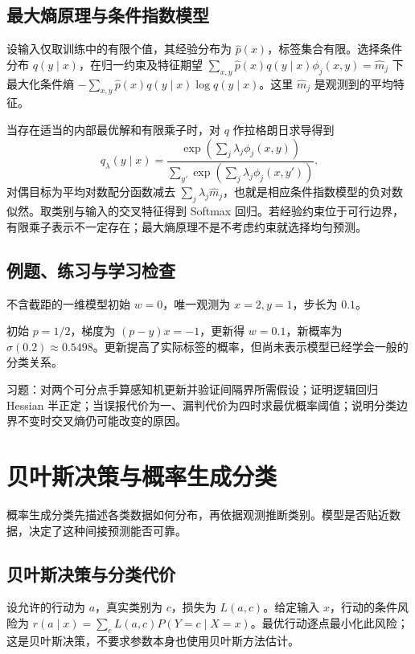 \documentclass[UTF8,12pt,a4paper,fontset=fandol]{ctexbook}
\begin{document}
\section{最大熵原理与条件指数模型}

设输入仅取训练中的有限个值，其经验分布为 $\widehat p(x)$，标签集合有限。选择条件分布 $q(y\mid x)$，在归一约束及特征期望
$\sum_{x,y}\widehat p(x)q(y\mid x)\phi_j(x,y)=\widehat m_j$
下最大化条件熵 $-\sum_{x,y}\widehat p(x)q(y\mid x)\log q(y\mid x)$。这里 $\widehat m_j$ 是观测到的平均特征。

当存在适当的内部最优解和有限乘子时，对 $q$ 作拉格朗日求导得到
\[
 q_\lambda(y\mid x)=
 \frac{\exp(\sum_j\lambda_j\phi_j(x,y))}
 {\sum_{y'}\exp(\sum_j\lambda_j\phi_j(x,y'))}.
\]
对偶目标为平均对数配分函数减去 $\sum_j\lambda_j\widehat m_j$，也就是相应条件指数模型的负对数似然。取类别与输入的交叉特征得到 Softmax 回归。若经验约束位于可行边界，有限乘子表示不一定存在；最大熵原理不是不考虑约束就选择均匀预测。

\section{例题、练习与学习检查}

\begin{example}[一次逻辑回归更新]
不含截距的一维模型初始 $w=0$，唯一观测为 $x=2,y=1$，步长为 $0.1$。
\end{example}
\begin{solve}
初始 $p=1/2$，梯度为 $(p-y)x=-1$，更新得 $w=0.1$，新概率为 $\sigma(0.2)\approx0.5498$。更新提高了实际标签的概率，但尚未表示模型已经学会一般的分类关系。
\end{solve}

习题：对两个可分点手算感知机更新并验证间隔界所需假设；证明逻辑回归 Hessian 半正定；当误报代价为一、漏判代价为四时求最优概率阈值；说明分类边界不变时交叉熵仍可能改变的原因。

\chapter{贝叶斯决策与概率生成分类}
\label{chap:ml-generative}

概率生成分类先描述各类数据如何分布，再依据观测推断类别。模型是否贴近数据，决定了这种间接预测能否可靠。

\section{贝叶斯决策与分类代价}

设允许的行动为 $a$，真实类别为 $c$，损失为 $L(a,c)$。给定输入 $x$，行动的条件风险为 $r(a\mid x)=\sum_cL(a,c)P(Y=c\mid X=x)$。最优行动逐点最小化此风险；这是贝叶斯决策，不要求参数本身也使用贝叶斯方法估计。
\end{document}
